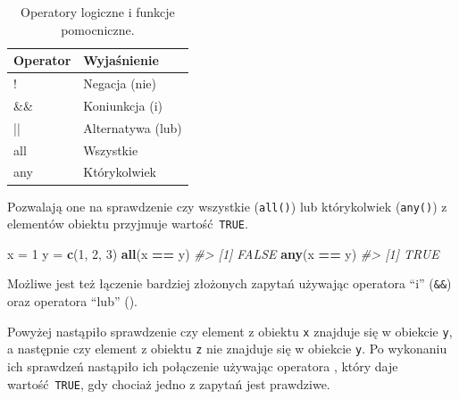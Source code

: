 \documentclass[paper=6in:9in,pagesize=pdftex,headinclude=on,footinclude=on,10pt]{scrbook}
\newenvironment{Shaded}{\begin{snugshade}}{\end{snugshade}}
\newcommand{\CommentTok}[1]{\textcolor[rgb]{0.56,0.35,0.01}{\textit{#1}}}
\newcommand{\DecValTok}[1]{\textcolor[rgb]{0.00,0.00,0.81}{#1}}
\newcommand{\KeywordTok}[1]{\textcolor[rgb]{0.13,0.29,0.53}{\textbf{#1}}}
\newcommand{\NormalTok}[1]{#1}
\newcommand{\OperatorTok}[1]{\textcolor[rgb]{0.81,0.36,0.00}{\textbf{#1}}}
\newcommand{\StringTok}[1]{\textcolor[rgb]{0.31,0.60,0.02}{#1}}
\begin{document}
\begin{table}

\caption{\label{tab:operators2}Operatory logiczne i funkcje pomocniczne.}
\centering
\begin{tabular}[t]{ll}
\toprule
Operator & Wyjaśnienie\\
\midrule
! & Negacja (nie)\\
\&\& & Koniunkcja (i)\\
|| & Alternatywa (lub)\\
all & Wszystkie\\
any & Którykolwiek\\
\bottomrule
\end{tabular}
\end{table}

Pozwalają one na sprawdzenie czy wszystkie (\texttt{all()}) lub którykolwiek (\texttt{any()}) z elementów obiektu przyjmuje wartość~\texttt{TRUE}.

\begin{Shaded}
\begin{Highlighting}[]
\NormalTok{x =}\StringTok{ }\DecValTok{1}
\NormalTok{y =}\StringTok{ }\KeywordTok{c}\NormalTok{(}\DecValTok{1}\NormalTok{, }\DecValTok{2}\NormalTok{, }\DecValTok{3}\NormalTok{)}
\KeywordTok{all}\NormalTok{(x }\OperatorTok{==}\StringTok{ }\NormalTok{y)}
\CommentTok{#> [1] FALSE}
\KeywordTok{any}\NormalTok{(x }\OperatorTok{==}\StringTok{ }\NormalTok{y)}
\CommentTok{#> [1] TRUE}
\end{Highlighting}
\end{Shaded}

Możliwe jest też łączenie bardziej złożonych zapytań używając operatora ``i'' (\texttt{\&\&}) oraz operatora ``lub'' (\texttt{\textbar{}\textbar{}}).

\begin{Shaded}
\end{Shaded}

Powyżej nastąpiło sprawdzenie czy element z obiektu \texttt{x} znajduje się w obiekcie \texttt{y}, a następnie czy element z obiektu \texttt{z} nie znajduje się w obiekcie \texttt{y}.
Po wykonaniu ich sprawdzeń nastąpiło ich połączenie używając operatora \texttt{\textbar{}\textbar{}}, który daje wartość~\texttt{TRUE}, gdy chociaż jedno z zapytań jest prawdziwe.
\end{document}
